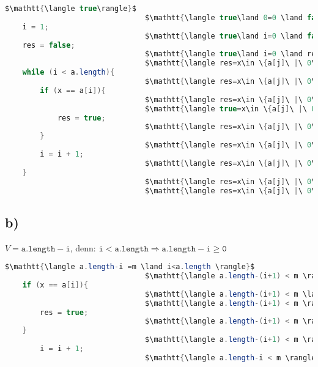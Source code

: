 \documentclass[a4paper,11pt]{scrartcl}
\begin{document}
	\begin{lstlisting}[mathescape=true, language=java]
								$\mathtt{\langle true\rangle}$		
								$\mathtt{\langle true\land 0=0 \land false= false\rangle}$
	i = 1;
								$\mathtt{\langle true\land i=0 \land false= false\rangle}$
	res = false;				
								$\mathtt{\langle true\land i=0 \land res= false\rangle}$	
								$\mathtt{\langle res=x\in \{a[j]\ |\ 0\leq j < i\}\land i\leq a.length\rangle}$
	while (i < a.length){
								$\mathtt{\langle res=x\in \{a[j]\ |\ 0\leq j < i\}\land i\leq a.length \land i<a.length \rangle}$
		if (x == a[i]){
								$\mathtt{\langle res=x\in \{a[j]\ |\ 0\leq j < i\}\land i\leq a.length \land i<a.length \land x = a[i] \rangle}$
								$\mathtt{\langle true=x\in \{a[j]\ |\ 0\leq j < i+1 \}\land i+1\leq a.length \rangle}$								
			res = true;
								$\mathtt{\langle res=x\in \{a[j]\ |\ 0\leq j < i+1 \}\land i+1\leq a.length \rangle}$			
		}
								$\mathtt{\langle res=x\in \{a[j]\ |\ 0\leq j < i+1 \}\land i+1\leq a.length \rangle}$		
		i = i + 1;
								$\mathtt{\langle res=x\in \{a[j]\ |\ 0\leq j < i\}\land i\leq a.length \rangle}$		
	}
								$\mathtt{\langle res=x\in \{a[j]\ |\ 0\leq j < i\}\land i\leq a.length \land \neg (i<a.length) \rangle}$
								$\mathtt{\langle res=x\in \{a[j]\ |\ 0\leq j < a.length-1\}\rangle}$								
	\end{lstlisting}

\subsection*{b)}

	$V = \mathtt{a.length-i}$, denn: $\mathtt{i<a.length\Longrightarrow a.length-i \geq 0}$


	\begin{lstlisting}[mathescape=true, language=java]
								$\mathtt{\langle a.length-i =m \land i<a.length \rangle}$	
								$\mathtt{\langle a.length-(i+1) < m \rangle}$		
	if (x == a[i]){
								$\mathtt{\langle a.length-(i+1) < m \land x = a[i] \rangle}$
								$\mathtt{\langle a.length-(i+1) < m \rangle}$														
		res = true;
								$\mathtt{\langle a.length-(i+1) < m \rangle}$			
	}
								$\mathtt{\langle a.length-(i+1) < m \rangle}$		
		i = i + 1;
								$\mathtt{\langle a.length-i < m \rangle}$			
	\end{lstlisting}
	


	
\end{document}
